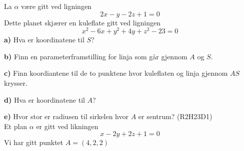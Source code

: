 La $ \alpha $ være gitt ved ligningen 
\[ 2x - y - 2z +1=0   \] 
Dette planet skjærer en kuleflate gitt ved ligningen
\[x^2 - 6x + y^2 + 4y + z^2 -23 = 0 \]
\textbf{a)} Hva er koordinatene til $ S $?\os

\textbf{b)} Finn en parameterframstilling for linja som går gjennom $ A $ og $ S $.\os

\textbf{c)} Finn koordiantene til de to punktene hvor kuleflaten og linja gjennom $ AS $ krysser.\os

\textbf{d)} Hva er koordinatene til $ A $?\os

\textbf{e)} Hvor stor er radiusen til sirkelen hvor $ A $ er sentrum?
\newpage
{} 
(R2H23D1) \\
Et plan $ \alpha $ er gitt ved likningen
\[ x-2y+2z+1=0 \]
Vi har gitt punktet $ A=(4, 2, 2) $

